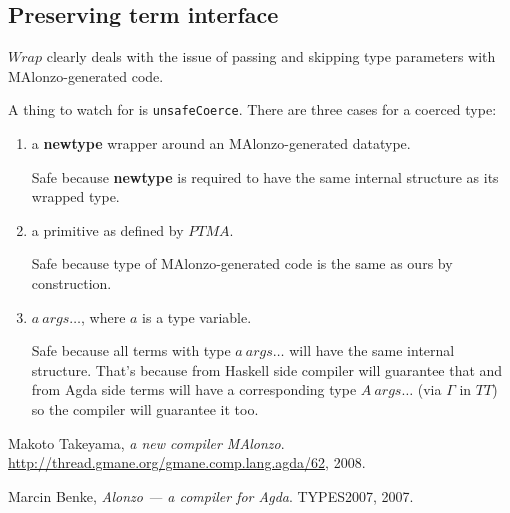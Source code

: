 \subsection{Preserving term interface}

\(Wrap\) clearly deals with the issue of passing and skipping type parameters with
MAlonzo-generated code.

A thing to watch for is \texttt{unsafeCoerce}.  There are three cases for a coerced type:
\begin{enumerate}
\item a \textbf{newtype} wrapper around an MAlonzo-generated datatype.

   Safe because \textbf{newtype} is required to have the same
   internal structure as its wrapped type.

\item a primitive as defined by \(PTMA\).

   Safe because type of MAlonzo-generated code is the same as ours by construction.

\item \(a\ args\ldots\), where \(a\) is a type variable.

   Safe because all terms with type \(a\ args\ldots\) will have the same internal
   structure. That's because from Haskell side compiler will guarantee that and
   from Agda side terms will have a corresponding type \(A\ args\ldots\) (via \(\Gamma\) in \(TT\))
   so the compiler will guarantee it too.
\end{enumerate}

\begin{thebibliography}{9}
   Makoto Takeyama,
   \emph{a new compiler MAlonzo}.
   \url{http://thread.gmane.org/gmane.comp.lang.agda/62},
   2008.

   Marcin Benke,
   \emph{Alonzo --- a compiler for Agda}.
   TYPES2007,
   2007.
\end{thebibliography}
